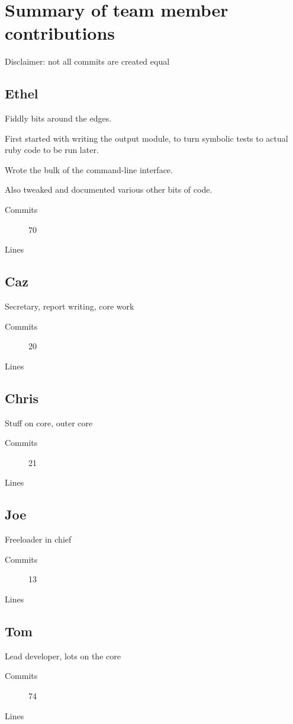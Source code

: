 \section{Summary of team member contributions}
Disclaimer: not all commits are created equal

  \subsection{Ethel}
    Fiddly bits around the edges.

    First started with writing the output module, to turn symbolic tests to actual ruby code to be run later.

    Wrote the bulk of the command-line interface.

    Also tweaked and documented various other bits of code.
    \begin{description}
      \item[Commits] 70
      \item[Lines]
    \end{description}

  \subsection{Caz}
    Secretary, report writing, core work
    \begin{description}
      \item[Commits] 20
      \item[Lines]
    \end{description}

  \subsection{Chris}
    Stuff on core, outer core
    \begin{description}
      \item[Commits] 21
      \item[Lines]
    \end{description}

  \subsection{Joe}
    Freeloader in chief
    \begin{description}
      \item[Commits] 13
      \item[Lines]
    \end{description}

  \subsection{Tom}
    Lead developer, lots on the core
    \begin{description}
      \item[Commits] 74
      \item[Lines]
    \end{description}
